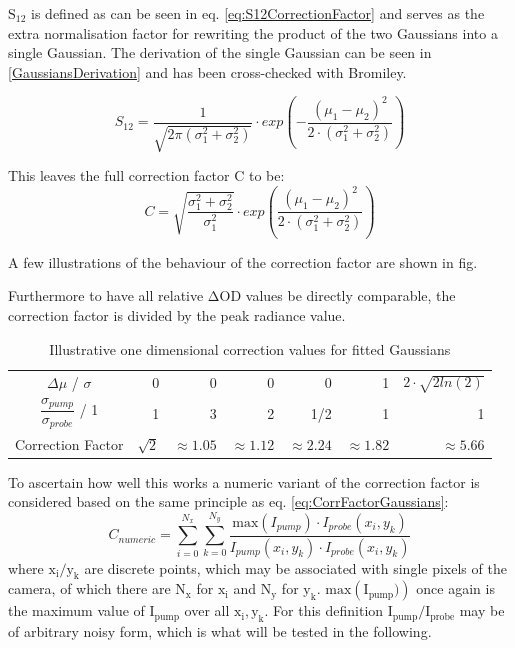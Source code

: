 \documentclass[twoside,openright]{scrreprt}
\begin{document}
$\mathrm{S_{12}}$ is defined as can be seen in eq. \ref{eq:S12CorrectionFactor} and serves as the extra normalisation factor for rewriting the product of the two Gaussians into a single Gaussian. The derivation of the single Gaussian can be seen in \ref{GaussiansDerivation} and has been cross-checked with Bromiley.\cite{Bromiley2014}

\begin{equation}\label{eq:S12CorrectionFactor}
S_{12} = \dfrac{1}{\sqrt{2\pi\left(\sigma_1^2+\sigma_2^2\right)}}\cdot exp\left(-\dfrac{\left(\mu_1 - \mu_2\right)^2}{2\cdot \left(\sigma_1^2+\sigma_2^2\right)}\right)
\end{equation}

This leaves the full correction factor C to be:
\begin{equation}\label{eq:fullCorrectionFactor}
C = \sqrt{\frac{\sigma_1^2+\sigma_2^2}{\sigma_1^2}}\cdot exp \left(\frac{\left(\mu_1-\mu_2\right)^2}{2\cdot \left(\sigma_1^2+\sigma_2^2\right)}\right)
\end{equation}

A few illustrations of the behaviour of the correction factor are shown in fig.

Furthermore to have all relative $\mathrm{\Delta OD}$ values be directly comparable, the correction factor is divided by the peak radiance value.

\begin{table}[h]
\caption{Illustrative one dimensional correction values for fitted Gaussians}
\centering
\begin{tabular}{c|rrrrrr}\toprule
$\Delta \mu$ / $\sigma$                     & 0          & 0             & 0              & 0             & 1              & $2\cdot\sqrt{2 ln(2)}$ \\
$\dfrac{\sigma_{pump}}{\sigma_{probe}}$ / 1 & 1          & 3             & 2              & 1/2           & 1              & 1                      \\
Correction Factor                           & $\sqrt{2}$ & $\approx1.05$ & $\approx 1.12$ & $\approx 2.24$ & $\approx 1.82$ & $\approx 5.66$ \\ \bottomrule       
\end{tabular}
\end{table}


To ascertain how well this works a numeric variant of the correction factor is considered based on the same principle as eq. \ref{eq:CorrFactorGaussians}:
\begin{equation*}
C_{numeric} = \sum_{i=0}^{N_x}\sum_{k=0}^{N_y}\frac{\mathrm{max}\left(I_{pump}\right)\cdot I_{probe}(x_i,y_k)}{I_{pump}(x_i,y_k)\cdot I_{probe}(x_i,y_k)}
\end{equation*}
where $\mathrm{x_i/y_k}$ are discrete points, which may be associated with single pixels of the camera, of which there are $\mathrm{N_x}$ for $\mathrm{x_i}$ and $\mathrm{N_y}$ for $\mathrm{y_k}$. $\mathrm{max\left(I_{pump})\right)}$ once again is the maximum value of $\mathrm{I_{pump}}$ over all $\mathrm{x_i, y_k}$. For this definition $\mathrm{I_{pump}/I_{probe}}$ may be of arbitrary noisy form, which is what will be tested in the following.
\end{document}
